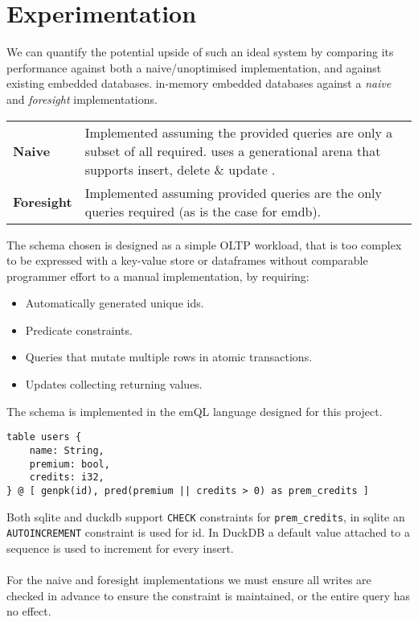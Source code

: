 \section{Experimentation}\label{sec:intro_experimentation}
We can quantify the potential upside of such an ideal system by comparing its performance against both a naive/unoptimised implementation, and against existing embedded databases.
in-memory embedded databases against a \textit{naive} and \textit{foresight} implementations.
\begin{center}
    \begin{tabular}{l p{}}
        \textbf{Naive}     & Implemented assuming the provided queries are only a subset of all required. uses a generational arena\cite{TypedGenerationalArenaRepo} that supports insert, delete \& update . \\
        \textbf{Foresight} & Implemented assuming provided queries are the only queries required (as is the case for emdb).                                                                                   \\
    \end{tabular}
\end{center}
\noindent
The schema chosen is designed as a simple OLTP workload, that is too complex to be expressed with a key-value store or dataframes without comparable programmer effort to a manual implementation, by requiring:
\begin{itemize}
    \setlength\itemsep{0em}
    \item Automatically generated unique ids.
    \item Predicate constraints.
    \item Queries that mutate multiple rows in atomic transactions.
    \item Updates collecting returning values.
\end{itemize}
The schema is implemented in the emQL language designed for this project.
\begin{verbatim}
table users {
    name: String,
    premium: bool,
    credits: i32,
} @ [ genpk(id), pred(premium || credits > 0) as prem_credits ]
\end{verbatim}
Both sqlite and duckdb support \texttt{CHECK} constraints for \texttt{prem_credits},
in sqlite an \texttt{AUTOINCREMENT} constraint is used for id. In DuckDB a default value
attached to a sequence is used to increment for every insert.
\\
\\ For the naive and foresight implementations we must ensure all writes are checked in advance to ensure the constraint is maintained, or the entire query has no effect.
